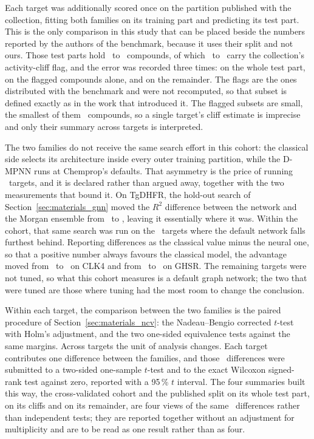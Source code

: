 Each target was additionally scored once on the partition published with the collection, fitting both families on its
training part and predicting its test part. This is the only comparison in this study that can be placed beside the
numbers reported by the authors of the benchmark, because it uses their split and not ours. Those test parts hold
\GenHoldoutNTestMin\ to \GenHoldoutNTestMax\ compounds, of which \GenCliffNTestMin\ to \GenCliffNTestMax\ carry the
collection's activity-cliff flag, and the error was recorded three times: on the whole test part, on the flagged
compounds alone, and on the remainder. The flags are the ones distributed with the benchmark and were not recomputed,
so that subset is defined exactly as in the work that introduced it. The flagged subsets are small, the smallest of
them \GenCliffNTestMin\ compounds, so a single target's cliff estimate is imprecise and only their summary across
targets is interpreted.

The two families do not receive the same search effort in this cohort: the classical side selects its architecture
inside every outer training partition, while the D-MPNN runs at Chemprop's defaults. That asymmetry is the price of
running \GenNTargets\ targets, and it is declared rather than argued away, together with the two measurements that
bound it. On TgDHFR, the hold-out search of Section~\ref{sec:materials_gnn} moved the $R^2$ difference between the
network and the Morgan ensemble from \GnnVsMorganDiffRTwo\ to \GnnTunedVsMorganDiffRTwo, leaving it essentially where
it was. Within the cohort, that same search was run on the \GenNTuned\ targets where the default network falls
furthest behind. Reporting differences as the classical value minus the neural one, so that a positive number always
favours the classical model, the advantage moved from \GenClkFourAdvRTwo\ to \GenClkFourTunedAdvRTwo\ on CLK4 and
from \GenGhsrAdvRTwo\ to \GenGhsrTunedAdvRTwo\ on GHSR. The remaining targets were not tuned, so what this cohort
measures is a default graph network; the two that were tuned are those where tuning had the most room to change the
conclusion.

Within each target, the comparison between the two families is the paired procedure of
Section~\ref{sec:materials_ncv}: the Nadeau--Bengio corrected $t$-test with Holm's adjustment, and the two one-sided
equivalence tests against the same margins. Across targets the unit of analysis changes. Each target contributes one
difference between the families, and those \GenNTargets\ differences were submitted to a two-sided one-sample
$t$-test and to the exact Wilcoxon signed-rank test against zero, reported with a 95\,\% $t$ interval. The four
summaries built this way, the cross-validated cohort and the published split on its whole test part, on its cliffs
and on its remainder, are four views of the same \GenNTargets\ differences rather than independent tests; they are
reported together without an adjustment for multiplicity and are to be read as one result rather than as four.

